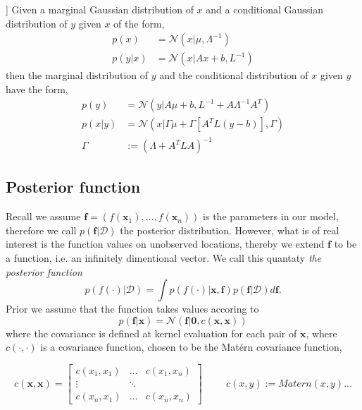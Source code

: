 \begin{testexample2}[Trick with normal distributions [from Bishops book?]]
    Given a marginal Gaussian distribution of $x$ and a conditional Gaussian distribution
    of $y$ given $x$ of the form, 
    \begin{align*}
        p(x) &= \mathcal{N}(x|\mu, \Lambda^{-1})\\
        p(y|x) &= \mathcal{N}(x|Ax+b, L^{-1})
    \end{align*}
    then the marginal distribution of $y$ and the conditional distribution of $x$ given $y$
    have the form, 
    \begin{align}
        p(y) &= \mathcal{N}(y|A\mu+b,L^{-1}+A \Lambda^{-1}A^T) \label{marginal_distribution}\\
        p(x|y) &= \mathcal{N}(x|\Gamma \mu+\Gamma [A^TL(y-b)],\Gamma )\\
        \Gamma &:= (\Lambda +A^TLA)^{-1}
    \end{align}
\end{testexample2}

\subsection*{Posterior function}
Recall we assume $\textbf{f} = (f(\textbf{x}_1), \dots, f(\textbf{x}_n))$ is the parameters in 
our model, therefore we call $p(\textbf{f}|\mathcal{D})$ the posterior distribution. However, 
what is of real interest is the function values on unobserved locations, thereby we 
extend $\textbf{f}$ to be a function, i.e. an infinitely dimentional vector. We call this 
quantaty \textit{the posterior function} 
\begin{equation}\label{posterior_function}
    p(f(\cdot)|\mathcal{D})= \int p(f(\cdot)|\textbf{x}, \textbf{f})p(\textbf{f}|\mathcal{D})d\textbf{f}.
\end{equation}
Prior we assume that the function takes values accoring to
$$p(\textbf{f}|\textbf{x}) = \mathcal{N}(\textbf{f}|\textbf{0}, c(\textbf{x}, \textbf{x}))$$
where the covariance is defined at kernel evaluation for each pair of $\textbf{x}$,
where $c(\cdot, \cdot)$ is a covariance function, chosen to be the Matérn covariance function,

  $$c(\textbf{x}, \textbf{x}) = \begin{bmatrix}
    c(x_1,x_1) & \dots & c(x_1,x_n)\\
    \vdots& \ddots\\
    c(x_n,x_1) & \dots & c(x_n,x_n)
\end{bmatrix}\hspace{1cm} c(x, y) := Matern(x,y)...$$ 

